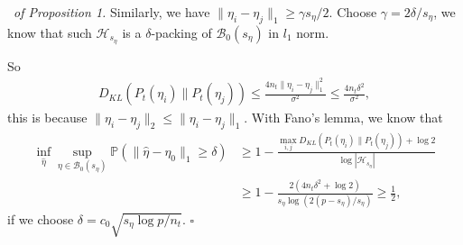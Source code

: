 \documentclass[12pt]{article}
\newenvironment{pf}{{\noindent \it Proof}\ }{\hfill $\square$\par}
\begin{document}
\begin{pf}{\it of Proposition 1. }
    Similarly, we have $\|\eta_i-\eta_j\|_1 \ge \gamma s_\eta/2$. Choose $\gamma = 2\delta/s_\eta $, we know that such $\mathcal{H}_{s_\eta}$ is a $\delta$-packing of $\mathcal{B}_0(s_\eta)$ in $l_1$ norm. 

    So
    \begin{align*}
        D_{KL}\left(P_t(\eta_i)\|P_t(\eta_j)\right)  \le \frac{4 n_t \|\eta_i-\eta_j\|_1^2}{\sigma^2} \le\frac{4 n_t \delta^2}{\sigma^2},
    \end{align*}
    this is because $\|\eta_i-\eta_j\|_2 \le \|\eta_i-\eta_j\|_1$. 
    With Fano's lemma, we know that 
    \begin{align*}
        \inf_{\hat{\eta}} \sup_{\eta \in \mathcal{B}_0(s_\eta)} \mathbb{P}\left(\|\hat{\eta} - \eta_0\|_1 \ge \delta\right) & \ge 1- \frac{\max_{i,j}D_{KL}\left(P_t(\eta_i)\|P_t(\eta_j)\right) +\log 2}{\log \left|\mathcal{H}_{s_\eta}\right|}\\ &\ge
        1- \frac{2(4n_t  \delta^2 +\log 2)}{s_\eta \log (2(p-s_\eta)/s_\eta)} \ge \frac{1}{2},
    \end{align*}
    if we choose $\delta = c_0\sqrt{s_\eta \log p/n_t}$. 
\end{pf}
\end{document}
